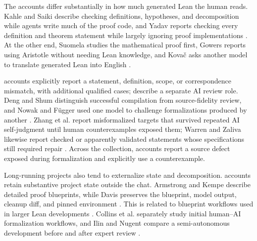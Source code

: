 \documentclass{article}
\begin{document}
 The accounts differ substantially in how much generated Lean the human reads.
Kahle and Saiki describe checking definitions, hypotheses, and decomposition
while agents write much of the proof code, and Yadav reports checking every
definition and theorem statement while largely ignoring proof implementations
\citep{kahle2026keeptrying,saiki2026double,yadav2026verification}.  At the other
end, Suomela studies the mathematical proof first, Gowers reports using
Aristotle without needing Lean knowledge, and Kova\v{c} asks another model to
translate generated Lean into English
\citep{suomela2026workflow,gowers2026leiden,kovac2025erdos189}.

\AccountSemanticMismatchCount{} accounts explicitly report a
statement, definition, scope, or correspondence mismatch, with
\AccountSemanticMismatchQualifiedCount{} additional qualified cases; \AccountSeparateAIReviewCount{}
describe a separate AI review role.  Deng and Shum distinguish successful
compilation from source-fidelity review, and Nowak and F\"ugger used one model
to challenge formalizations produced by another
\citep{deng2026probability,nowak2026workflow}.  Zhang et al. report
misformalized targets that survived repeated AI self-judgment until human
counterexamples exposed them; Warren and Zaliva likewise report checked or
apparently validated statements whose specifications still required repair
\citep{zhang2026slt,warren2026tessera,zaliva2026semantics}.  Across the
collection, \AccountSourceDefectCount{} accounts report a source defect exposed
during formalization and \AccountCounterexampleCount{} explicitly use a
counterexample.

Long-running projects also tend to externalize state and decomposition.
\AccountPersistentStateCount{} accounts retain substantive project state outside
the chat.  Armstrong and Kempe describe detailed proof blueprints, while Davis
preserves the blueprint, model output, cleanup diff, and pinned environment
\citep{armstrong2026degiorgi,davis2026gdlean}.  This is related to blueprint
workflows used in larger Lean developments
\citep{liquidblueprint2023,pfrblueprint2024,zhu2026leanarchitect}.  Collins et
al. separately study initial human--AI formalization workflows, and Ilin and
Nugent compare a semi-autonomous development before and after expert review
\citep{collins2026workflows,ilin2026sorries}.
\end{document}
